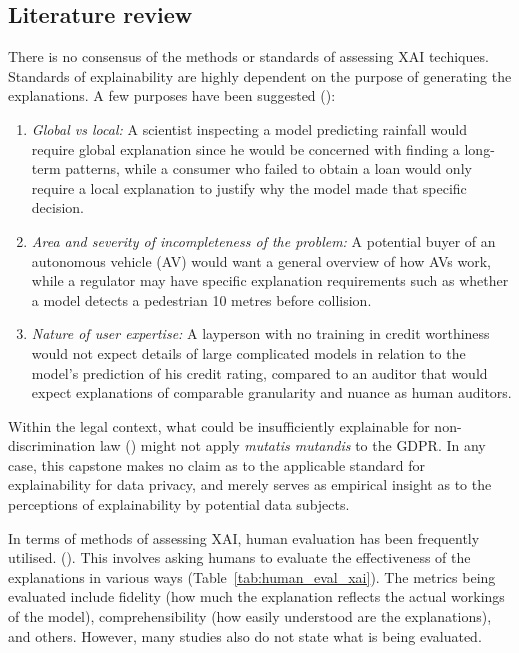 \subsection{Literature review}
There is no consensus of the methods or standards of assessing XAI techiques. Standards of explainability are highly dependent on the purpose of generating the explanations. A few purposes have been suggested (\cite{doshi-velez2017}):
\begin{enumerate}
	\item \textit{Global vs local:} A scientist inspecting a model predicting rainfall would require global explanation since he would be concerned with finding a long-term patterns, while a consumer who failed to obtain a loan would only require a local explanation to justify why the model made that specific decision.
	\item \textit{Area and severity of incompleteness of the problem:} A potential buyer of an autonomous vehicle (AV) would want a general overview of how AVs work, while a regulator may have specific explanation requirements such as whether a model detects a pedestrian 10 metres before collision.
	\item \textit{Nature of user expertise:} A layperson with no training in credit worthiness would not expect details of large complicated models in relation to the model's prediction of his credit rating, compared to an auditor that would expect explanations of comparable granularity and nuance as human auditors.
\end{enumerate}

Within the legal context, what could be insufficiently explainable for non-discrimination law (\cite{vale2022explainable}) might not apply \textit{mutatis mutandis} to the GDPR. In any case, this capstone makes no claim as to the applicable standard for explainability for data privacy, and merely serves as empirical insight as to the perceptions of explainability by potential data subjects.

In terms of methods of assessing XAI, human evaluation has been frequently utilised. (\cite{danilevsky2020}). This involves asking humans to evaluate the effectiveness of the explanations in various ways (Table~\ref{tab:human_eval_xai}). The metrics being evaluated include fidelity (how much the explanation reflects the actual workings of the model), comprehensibility (how easily understood are the explanations), and others. However, many studies also do not state what is being evaluated. 


